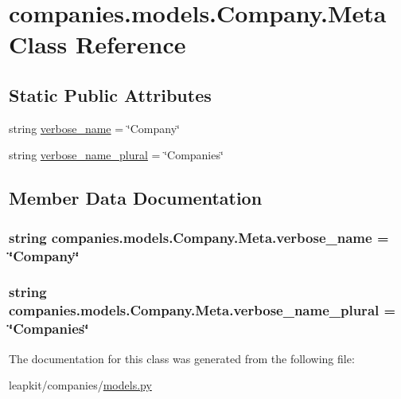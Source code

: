 \hypertarget{classcompanies_1_1models_1_1_company_1_1_meta}{\section{companies.\-models.\-Company.\-Meta Class Reference}
\label{classcompanies_1_1models_1_1_company_1_1_meta}
}
\subsection*{Static Public Attributes}
\begin{DoxyCompactItemize}
\item 
string \hyperlink{classcompanies_1_1models_1_1_company_1_1_meta_a3124baffc52d6ed0cac976c2ffbe1c7e}{verbose\-\_\-name} = \char`\"{}Company\char`\"{}
\item 
string \hyperlink{classcompanies_1_1models_1_1_company_1_1_meta_ac71de5784bee79dd2c3341c41666ea59}{verbose\-\_\-name\-\_\-plural} = \char`\"{}Companies\char`\"{}
\end{DoxyCompactItemize}


\subsection{Member Data Documentation}
\hypertarget{classcompanies_1_1models_1_1_company_1_1_meta_a3124baffc52d6ed0cac976c2ffbe1c7e}{
\subsubsection[{verbose\-\_\-name}]{\setlength{\rightskip}{0pt plus 5cm}string companies.\-models.\-Company.\-Meta.\-verbose\-\_\-name = \char`\"{}Company\char`\"{}\hspace{0.3cm}{\ttfamily [static]}}}\label{classcompanies_1_1models_1_1_company_1_1_meta_a3124baffc52d6ed0cac976c2ffbe1c7e}
\hypertarget{classcompanies_1_1models_1_1_company_1_1_meta_ac71de5784bee79dd2c3341c41666ea59}{
\subsubsection[{verbose\-\_\-name\-\_\-plural}]{\setlength{\rightskip}{0pt plus 5cm}string companies.\-models.\-Company.\-Meta.\-verbose\-\_\-name\-\_\-plural = \char`\"{}Companies\char`\"{}\hspace{0.3cm}{\ttfamily [static]}}}\label{classcompanies_1_1models_1_1_company_1_1_meta_ac71de5784bee79dd2c3341c41666ea59}


The documentation for this class was generated from the following file\-:\begin{DoxyCompactItemize}
\item 
leapkit/companies/\hyperlink{companies_2models_8py}{models.\-py}\end{DoxyCompactItemize}
